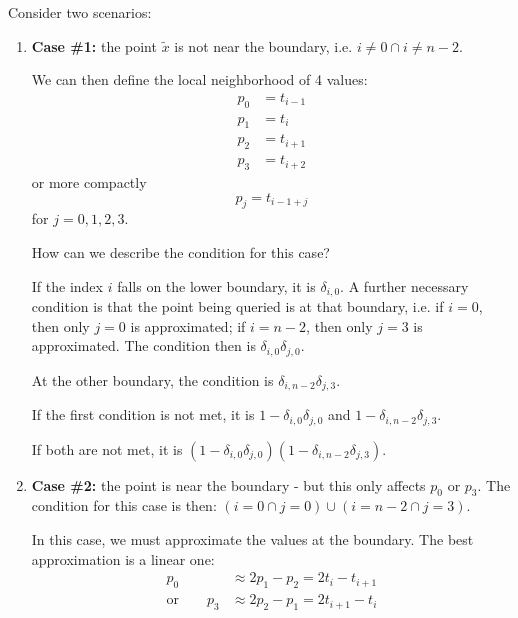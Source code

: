 \documentclass[11pt]{article}
\begin{document}
Consider two scenarios:
\begin{enumerate}
\item \textbf{Case \#1:} the point $\tilde{x}$ is not near the boundary, i.e. $i \neq 0 \cap i \neq n-2$.

We can then define the local neighborhood of 4 values:
\begin{equation*}
\begin{split}
p_0 &= t_{i-1} \\ 
p_1 &= t_i \\
p_2 &= t_{i+1} \\
p_3 &= t_{i+2}
\end{split}
\end{equation*}
or more compactly
\begin{equation*}
p_j = t_{i-1+j}
\end{equation*}
for $j=0,1,2,3$.

How can we describe the condition for this case?

If the index $i$ falls on the lower boundary, it is $\delta_{i,0}$. A further necessary condition is that the point being queried is at that boundary, i.e. if $i=0$, then only $j=0$ is approximated; if $i=n-2$, then only $j=3$ is approximated. The condition then is $\delta_{i,0} \delta_{j,0}$.

At the other boundary, the condition is $\delta_{i,n-2} \delta_{j,3}$.

If the first condition is not met, it is $1-\delta_{i,0} \delta_{j,0}$ and $1-\delta_{i,n-2} \delta_{j,3}$.

If both are not met, it is $(1-\delta_{i,0} \delta_{j,0}) (1-\delta_{i,n-2} \delta_{j,3})$.

\item \textbf{Case \#2:} the point is near the boundary - but this only affects $p_0$ or $p_3$. The condition for this case is then: $( i = 0 \cap j = 0) \cup ( i = n-2 \cap j = 3 )$.

In this case, we must approximate the values at the boundary. The best approximation is a linear one:
\begin{equation}
\begin{split}
p_0 &\approx 2 p_1 - p_2 = 2 t_i - t_{i+1} \\
\text{or} \qquad p_3 &\approx 2 p_2 - p_1 = 2 t_{i+1} - t_i
\end{split}
\end{equation}

\end{enumerate}
\end{document}
